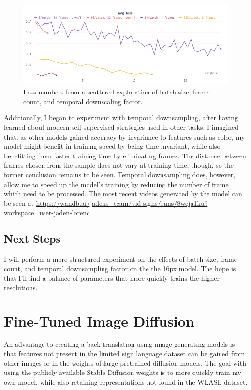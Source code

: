 \documentclass{article}
\begin{document}
\begin{figure}
  \centering
  \includegraphics[scale=0.5]{graph.png}
  \caption{Loss numbers from a scattered exploration of batch size, frame count, and temporal downscaling factor.}
  \label{fig:fig2}
\end{figure}

Additionally, I began to experiment with temporal downsampling, after having learned about modern self-supervised strategies used in other tasks. I imagined that, as other models gained accuracy by invariance to features such as color, my model might benefit in training speed by being time-invariant, while also benefitting from faster training time by eliminating frames. The distance between frames chosen from the sample does not vary at training time, though, so the former conclusion remains to be seen. Temporal downsampling does, however, allow me to speed up the model's training by reducing the number of frame which need to be processed. The most recent videos generated by the model can be seen at \url{https://wandb.ai/jadens_team/vid-signs/runs/8weja1ku?workspace=user-jaden-lorenc}

\subsection{Next Steps}
I will perform a more structured experiment on the effects of batch size, frame count, and temporal downsampling factor on the the 16px model. The hope is that I'll find a balance of parameters that more quickly trains the higher resolutions. 

\section{Fine-Tuned Image Diffusion}
An advantage to creating a back-translation using image generating models is that features not present in the limited sign language dataset can be gained from other images or in the weights of large pretrained diffusion models. The goal with using the publicly available Stable Diffusion weights is to more quickly train my own model, while also retaining representations not found in the WLASL dataset. 
\end{document}
